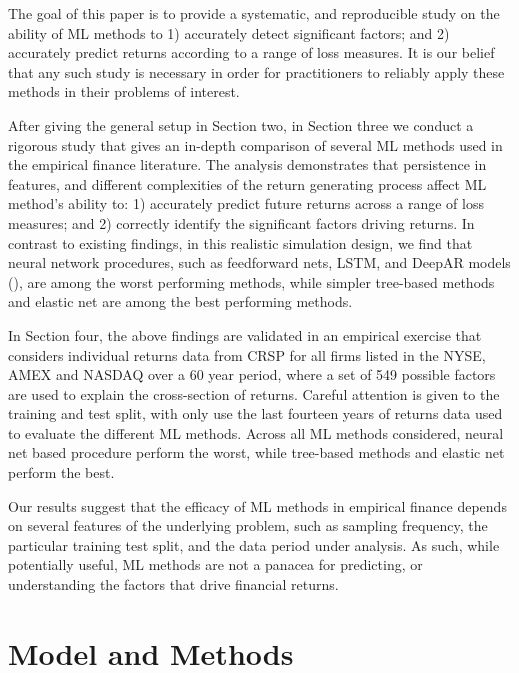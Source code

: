 \documentclass{article}
\begin{document}
The goal of this paper is to provide a systematic, and reproducible study on the ability of ML methods to 1) accurately detect significant factors; and 2) accurately predict returns according to a range of loss measures. It is our belief that any such study is necessary in order for practitioners to reliably apply these methods in their problems of interest. 

After giving the general setup in Section two, in Section three we conduct a rigorous study that gives an in-depth comparison of several ML methods used in the empirical finance literature. The analysis demonstrates that persistence in features, and different complexities of the return generating process affect ML method's ability to: 1) accurately predict future returns across a range of loss measures; and 2) correctly identify the significant factors driving returns. In contrast to existing findings, in this realistic simulation design, we find that neural network procedures, such as feedforward nets, LSTM, and DeepAR models (\cite{salinas2019deepar}), are among the worst performing methods, while simpler tree-based methods and elastic net are among the best performing methods. %

In Section four, the above findings are validated in an empirical exercise that considers individual returns data from CRSP for all firms listed in the NYSE, AMEX and NASDAQ over a 60 year period, where a set of 549 possible factors are used to explain the cross-section of returns. Careful attention is given to the training and test split, with only use the last fourteen years of returns data used to evaluate the different ML methods. Across all ML methods considered, neural net based procedure perform the worst, while tree-based methods and elastic net perform the best. 


Our results suggest that the efficacy of ML methods in empirical finance depends on several features of the underlying problem, such as sampling frequency, the particular training test split, and the data period under analysis. As such, while potentially useful, ML methods are not a panacea for predicting, or understanding the factors that drive financial returns. 


\section{Model and Methods}
\end{document}
